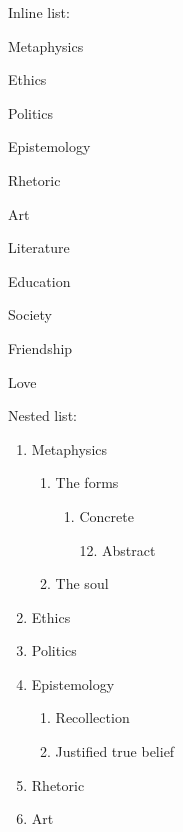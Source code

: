 \documentclass[11pt]{article}
\begin{document}
		Inline list: \\
		\begin{enumerate*}
    		\item Metaphysics
			\item Ethics
			\item Politics
			\item Epistemology
			\item Rhetoric
			\item Art
			\item \mbox{Literature}
			\item Education
			\item Society
			\item Friendship
			\item Love
		\end{enumerate*}


		Nested list:
		\begin{enumerate}
    		\item Metaphysics
				\begin{enumerate}
					\item The forms
						\begin{enumerate}
							\item Concrete
							\item[12.] Abstract
						\end{enumerate}
					\item The soul
				\end{enumerate}
			\item Ethics
			\item Politics
			\item Epistemology
				\begin{enumerate}
					\item Recollection
					\item Justified true belief
				\end{enumerate}
			\item Rhetoric
			\item Art
		\end{enumerate}
\end{document}
